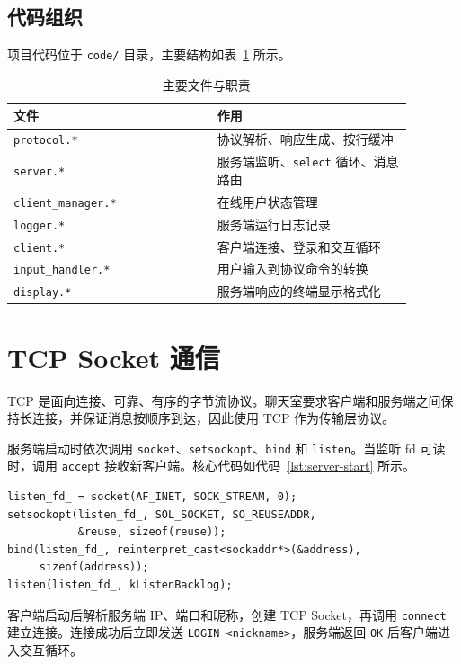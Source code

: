 \documentclass[UTF8,zihao=5,twocolumn]{ctexart}
\newcommand{\code}[1]{\texttt{#1}}
\begin{document}
\subsection{代码组织}

项目代码位于 \code{code/} 目录，主要结构如表~\ref{tab:files} 所示。

\begin{table}[ht]
\centering
\caption{主要文件与职责}
\label{tab:files}
\small
\begin{tabular}{p{0.45\linewidth}p{0.43\linewidth}}
\toprule
文件 & 作用 \\
\midrule
\code{protocol.*} & 协议解析、响应生成、按行缓冲 \\
\code{server.*} & 服务端监听、\code{select} 循环、消息路由 \\
\code{client\_manager.*} & 在线用户状态管理 \\
\code{logger.*} & 服务端运行日志记录 \\
\code{client.*} & 客户端连接、登录和交互循环 \\
\code{input\_handler.*} & 用户输入到协议命令的转换 \\
\code{display.*} & 服务端响应的终端显示格式化 \\
\bottomrule
\end{tabular}
\end{table}

\section{TCP Socket 通信}

TCP 是面向连接、可靠、有序的字节流协议。聊天室要求客户端和服务端之间保持长连接，并保证消息按顺序到达，因此使用 TCP 作为传输层协议。

服务端启动时依次调用 \code{socket}、\code{setsockopt}、\code{bind} 和 \code{listen}。当监听 fd 可读时，调用 \code{accept} 接收新客户端。核心代码如代码~\ref{lst:server-start} 所示。

\begin{lstlisting}[style=cppstyle,caption={服务端 Socket 初始化},label={lst:server-start}]
listen_fd_ = socket(AF_INET, SOCK_STREAM, 0);
setsockopt(listen_fd_, SOL_SOCKET, SO_REUSEADDR,
           &reuse, sizeof(reuse));
bind(listen_fd_, reinterpret_cast<sockaddr*>(&address),
     sizeof(address));
listen(listen_fd_, kListenBacklog);
\end{lstlisting}

客户端启动后解析服务端 IP、端口和昵称，创建 TCP Socket，再调用 \code{connect} 建立连接。连接成功后立即发送 \code{LOGIN <nickname>}，服务端返回 \code{OK} 后客户端进入交互循环。
\end{document}
